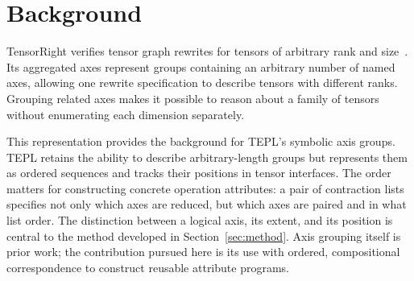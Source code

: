 \FloatBarrier
\section{Background}
\label{sec:background}
TensorRight verifies tensor graph rewrites for tensors of arbitrary rank and
size~\cite{tensorright}. Its aggregated axes represent groups containing an
arbitrary number of named axes, allowing one rewrite specification to describe
tensors with different ranks. Grouping related axes makes it possible to reason
about a family of tensors without enumerating each dimension separately.

This representation provides the background for TEPL's symbolic axis groups.
TEPL retains the ability to describe arbitrary-length groups but represents
them as ordered sequences and tracks their positions in tensor interfaces.
The order matters for constructing concrete operation attributes: a pair of
contraction lists specifies not only which axes are reduced, but which axes
are paired and in what list order. The distinction between a logical axis,
its extent, and its position is central to the method developed in
Section~\ref{sec:method}. Axis grouping itself is prior work; the contribution
pursued here is its use with ordered, compositional correspondence to
construct reusable attribute programs.
